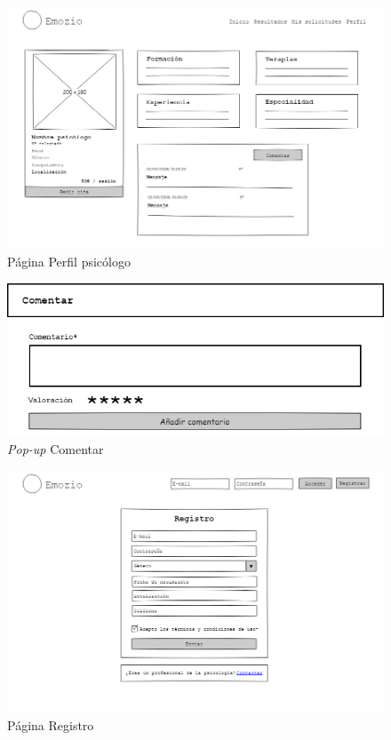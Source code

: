 \begin{figure}[htbp] 
    \centering
    \includegraphics[width=1\textwidth]{figuras/mockup_pacientes/perfil_psicologo.png}
    \caption{Página Perfil psicólogo}
\end{figure}	

\begin{figure}[htbp] 
    \centering
    \includegraphics[width=1\textwidth]{figuras/mockup_pacientes/comentar.png}
    \caption{\textit{Pop-up} Comentar}
\end{figure}	

\begin{figure}[htbp] 
    \centering
    \includegraphics[width=1\textwidth]{figuras/mockup_pacientes/registro.png}
    \caption{Página Registro}
\end{figure}	

